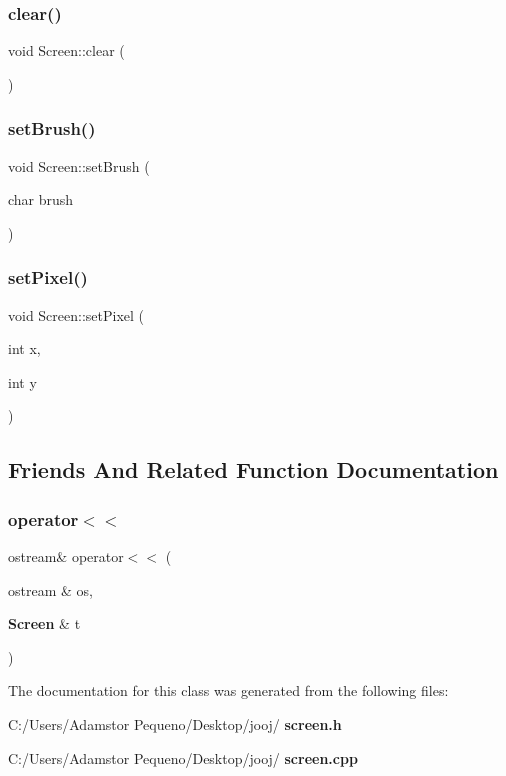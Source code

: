 \subsubsection{clear()}
{\footnotesize\ttfamily void Screen\+::clear (\begin{DoxyParamCaption}{ }\end{DoxyParamCaption})}

\mbox{\label{class_screen_a14a00e158f99df199772172554a20576}} 
\subsubsection{set\+Brush()}
{\footnotesize\ttfamily void Screen\+::set\+Brush (\begin{DoxyParamCaption}\item[{char}]{brush }\end{DoxyParamCaption})}

\mbox{\label{class_screen_ae6bea81c57a22d226507c3c26fa95ee0}} 
\subsubsection{set\+Pixel()}
{\footnotesize\ttfamily void Screen\+::set\+Pixel (\begin{DoxyParamCaption}\item[{int}]{x,  }\item[{int}]{y }\end{DoxyParamCaption})}



\subsection{Friends And Related Function Documentation}
\mbox{\label{class_screen_aab6a2880746bfe1b7964817cc8f0989e}} 
\subsubsection{operator$<$$<$}
{\footnotesize\ttfamily ostream\& operator$<$$<$ (\begin{DoxyParamCaption}\item[{ostream \&}]{os,  }\item[{\textbf{ Screen} \&}]{t }\end{DoxyParamCaption})\hspace{0.3cm}{\ttfamily [friend]}}



The documentation for this class was generated from the following files\+:\begin{DoxyCompactItemize}
\item 
C\+:/\+Users/\+Adamstor Pequeno/\+Desktop/jooj/\textbf{ screen.\+h}\item 
C\+:/\+Users/\+Adamstor Pequeno/\+Desktop/jooj/\textbf{ screen.\+cpp}\end{DoxyCompactItemize}
